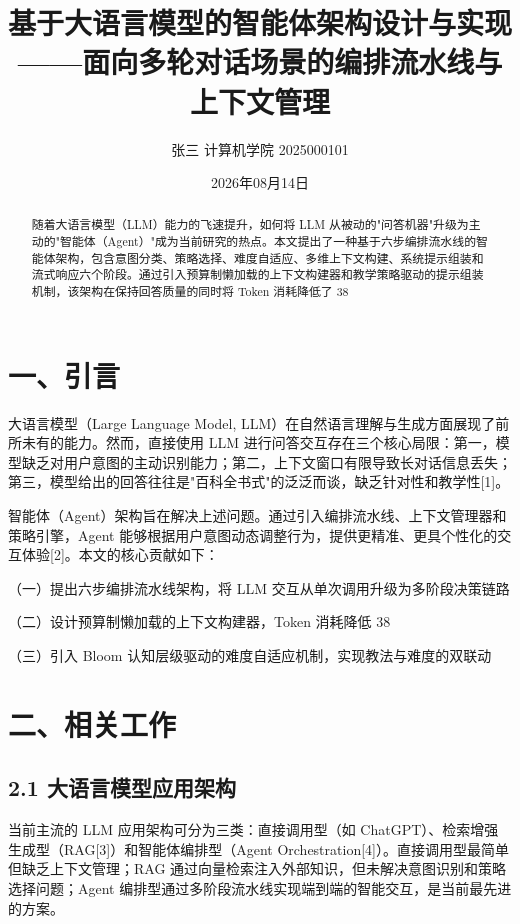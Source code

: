 \documentclass{harryopo-paper}
\title{基于大语言模型的智能体架构设计与实现——面向多轮对话场景的编排流水线与上下文管理}
\author{张三  计算机学院  2025000101}
\date{2026年08月14日}
\begin{document}
\maketitle
\begin{abstract}
随着大语言模型（LLM）能力的飞速提升，如何将 LLM 从被动的"问答机器"升级为主动的"智能体（Agent）"成为当前研究的热点。本文提出了一种基于六步编排流水线的智能体架构，包含意图分类、策略选择、难度自适应、多维上下文构建、系统提示组装和流式响应六个阶段。通过引入预算制懒加载的上下文构建器和教学策略驱动的提示组装机制，该架构在保持回答质量的同时将 Token 消耗降低了 38%
\end{abstract}

\section*{一、引言}

大语言模型（Large Language Model, LLM）在自然语言理解与生成方面展现了前所未有的能力。然而，直接使用 LLM 进行问答交互存在三个核心局限：第一，模型缺乏对用户意图的主动识别能力；第二，上下文窗口有限导致长对话信息丢失；第三，模型给出的回答往往是"百科全书式"的泛泛而谈，缺乏针对性和教学性[1]。

智能体（Agent）架构旨在解决上述问题。通过引入编排流水线、上下文管理器和策略引擎，Agent 能够根据用户意图动态调整行为，提供更精准、更具个性化的交互体验[2]。本文的核心贡献如下：

（一）提出六步编排流水线架构，将 LLM 交互从单次调用升级为多阶段决策链路

（二）设计预算制懒加载的上下文构建器，Token 消耗降低 38%

（三）引入 Bloom 认知层级驱动的难度自适应机制，实现教法与难度的双联动

\section*{二、相关工作}

\subsection*{2.1 大语言模型应用架构}

当前主流的 LLM 应用架构可分为三类：直接调用型（如 ChatGPT）、检索增强生成型（RAG[3]）和智能体编排型（Agent Orchestration[4]）。直接调用型最简单但缺乏上下文管理；RAG 通过向量检索注入外部知识，但未解决意图识别和策略选择问题；Agent 编排型通过多阶段流水线实现端到端的智能交互，是当前最先进的方案。
\end{document}
